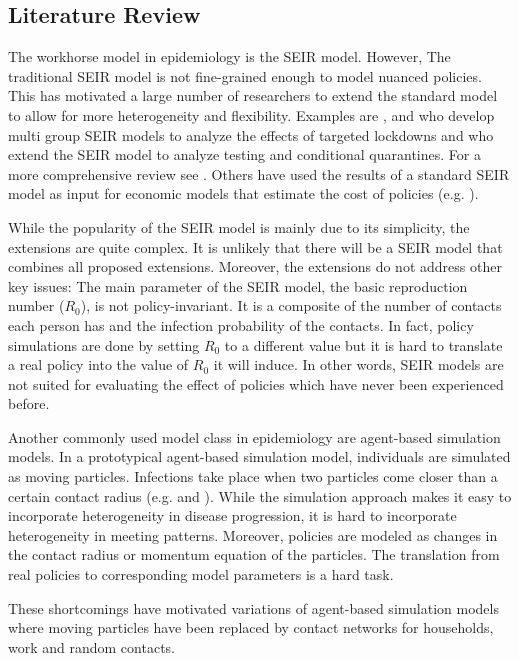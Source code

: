 \subsection{Literature Review}
\label{sec:literature_review}

The workhorse model in epidemiology is the SEIR model. However,
The traditional SEIR model is not fine-grained enough to model nuanced policies. This
has motivated a large number of researchers to extend the standard model to allow for
more heterogeneity and flexibility. Examples are \citet{Grimm2020},
\citet{Donsimoni2020} and \citet{Acemoglu2020} who develop multi group SEIR models to
analyze the effects of targeted lockdowns and \citet{Berger2020} who extend the SEIR
model to analyze testing and conditional quarantines. For a more comprehensive review
see \citet{Avery2020}. Others have used the results of a standard SEIR model as input
for economic models that estimate the cost of policies (e.g. \citet{Dorn2020}).

While the popularity of the SEIR model is mainly due to its simplicity, the extensions
are quite complex. It is unlikely that there will be a SEIR model that combines all
proposed extensions. Moreover, the extensions do not address other key issues: The main
parameter of the SEIR model, the basic reproduction number ($R_0$), is not
policy-invariant. It is a composite of the number of contacts each person has and the
infection probability of the contacts. In fact, policy simulations are done by setting
$R_0$ to a different value but it is hard to translate a real policy into the value of
$R_0$ it will induce. In other words, SEIR models are not suited for evaluating the
effect of policies which have never been experienced before.

Another commonly used model class in epidemiology are agent-based simulation
models. In a prototypical agent-based simulation model, individuals are
simulated as moving particles. Infections take place when two particles come closer than
a certain contact radius (e.g. \citet{Silva2020} and \citet{Cuevas2020}). While the
simulation approach makes it easy to incorporate heterogeneity in disease progression, it
is hard to incorporate heterogeneity in meeting patterns. Moreover, policies are modeled
as changes in the contact radius or momentum equation of the particles. The translation
from real policies to corresponding model parameters is a hard task.

These shortcomings have motivated variations of agent-based simulation models where
moving particles have been replaced by contact networks for households, work and random
contacts.


